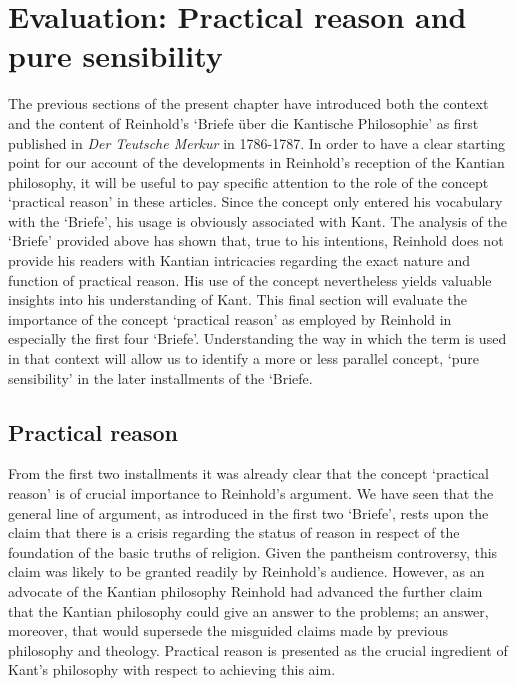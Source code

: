 \section{Evaluation: Practical reason and pure sensibility}


The previous sections of the present chapter have introduced both the context and the content of Reinhold's `Briefe \"{u}ber die Kantische Philosophie' as first published in \textit{Der Teutsche Merkur} in 1786{-}1787. In order to have a clear starting point for our account of the developments in Reinhold's reception of the Kantian philosophy, it will be useful to pay specific attention to the role of the concept `practical reason' in these articles. Since the concept only entered his vocabulary with the `Briefe', his usage is obviously associated with Kant. The analysis of the `Briefe' provided above has shown that, true to his intentions, Reinhold does not provide his readers with Kantian intricacies regarding the exact nature and function of practical reason. His use of the concept nevertheless yields valuable insights into his understanding of Kant. This final section will evaluate the importance of the concept `practical reason' as employed by Reinhold in especially the first four `Briefe'. Understanding the way in which the term is used in that context will allow us to identify a more or less parallel concept, `pure sensibility' in the later installments of the `Briefe.


\subsection{Practical reason}


From the first two installments it was already clear that the concept `practical reason' is of crucial importance to Reinhold's argument. We have seen that the general line of argument, as introduced in the first two `Briefe', rests upon the claim that there is a crisis regarding the status of reason in respect of the foundation of the basic truths of religion. Given the pantheism controversy, this claim was likely to be granted readily by Reinhold's audience. However, as an advocate of the Kantian philosophy Reinhold had advanced the further claim that the Kantian philosophy could give an answer to the problems; an answer, moreover, that would supersede the misguided claims made by previous philosophy and theology. Practical reason is presented as the crucial ingredient of Kant's philosophy with respect to achieving this aim. 

